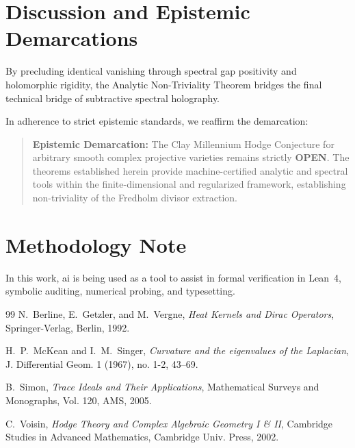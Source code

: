 \documentclass[11pt,a4paper]{article}
\theoremstyle{definition}
\begin{document}
\section{Discussion and Epistemic Demarcations}

By precluding identical vanishing through spectral gap positivity and holomorphic rigidity, the Analytic Non-Triviality Theorem bridges the final technical bridge of subtractive spectral holography.

In adherence to strict epistemic standards, we reaffirm the demarcation:
\begin{quote}
\textbf{Epistemic Demarcation:} The Clay Millennium Hodge Conjecture for arbitrary smooth complex projective varieties remains strictly \textbf{OPEN}. The theorems established herein provide machine-certified analytic and spectral tools within the finite-dimensional and regularized framework, establishing non-triviality of the Fredholm divisor extraction.
\end{quote}

\section*{Methodology Note}
In this work, ai is being used as a tool to assist in formal verification in Lean~4, symbolic auditing, numerical probing, and typesetting.

\begin{thebibliography}{99}
N.~Berline, E.~Getzler, and M.~Vergne,
\emph{Heat Kernels and Dirac Operators},
Springer-Verlag, Berlin, 1992.

H.~P.~McKean and I.~M.~Singer,
\emph{Curvature and the eigenvalues of the Laplacian},
J. Differential Geom. 1 (1967), no. 1-2, 43--69.

B.~Simon,
\emph{Trace Ideals and Their Applications},
Mathematical Surveys and Monographs, Vol. 120, AMS, 2005.

C.~Voisin,
\emph{Hodge Theory and Complex Algebraic Geometry I \& II},
Cambridge Studies in Advanced Mathematics, Cambridge Univ. Press, 2002.
\end{thebibliography}
\end{document}
